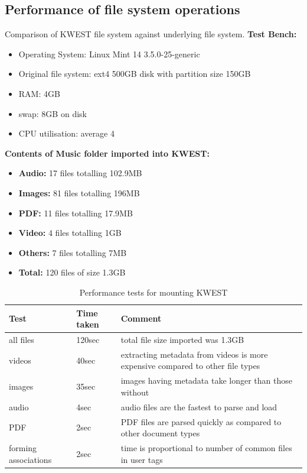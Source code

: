 \subsection{Performance of file system operations}
Comparison of KWEST file system against underlying file system.
\textbf{Test Bench:}
\begin{itemize}
\item Operating System: Linux Mint 14 3.5.0-25-generic
\item Original file system: ext4 500GB disk with partition size 150GB
\item RAM: 4GB
\item swap: 8GB on disk
\item CPU utilisation: average 4%
\end{itemize}
\textbf{Contents of Music folder imported into KWEST:}
\begin{itemize}
\item \textbf{Audio:} 17 files totalling 102.9MB
\item \textbf{Images:} 81 files totalling 196MB
\item \textbf{PDF:} 11 files totalling 17.9MB
\item \textbf{Video:} 4 files totalling 1GB
\item \textbf{Others:} 7 files totalling 7MB
\item \textbf{Total:} 120 files of size 1.3GB
\end{itemize}

\begin{table}[h]
\begin{tabular}{|p{3cm}|p{2cm}|p{7cm}|}
\hline
\textbf{Test} & \textbf{Time taken} & \textbf{Comment} \\ \hline
all files	&	120sec	& total file size imported was 1.3GB \\ \hline
videos	& 40sec	&	extracting metadata from videos is more expensive compared to other file types \\ \hline
images	& 35sec & images having metadata take longer than those without \\ \hline
audio 	& 4sec	& audio files are the fastest to parse and load \\ \hline
PDF		& 2sec	& PDF files are parsed quickly as compared to other document types \\ \hline
forming associations & 2sec	 & time is proportional to number of common files in user tags \\
\hline
\end{tabular}
\caption{Performance tests for mounting KWEST}
\label{performancemount}
\end{table}

